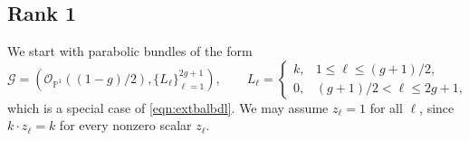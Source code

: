 \documentclass[12pt, letterpaper]{amsart}
\theoremstyle{definition}
\newcommand{\PP}{\mathbb{P} }
\newcommand{\cG}{\mathcal{G} }
\newcommand{\cO}{\mathcal{O} }
\begin{document}
\subsection{Rank 1}\label{ssec:rank1}

We start with parabolic bundles of the form
\begin{equation}\label{eqn:rank1}
\cG=\left(\cO_{\PP^1}\!\left((1-g)/2\right),\{L_\ell\}_{\ell=1}^{2g+1}\right),\qquad L_\ell= \begin{cases} k, & 1\le \ell\le (g+1)/2,\\[4pt] 0, & (g+1)/2<\ell\le 2g+1, \end{cases}
\end{equation}
which is a special case of \eqref{eqn:extbalbdl}. We may assume \(z_\ell=1\) for all \(\ell\), since \(k\cdot z_\ell=k\) for every nonzero scalar \(z_\ell\).
\end{document}
